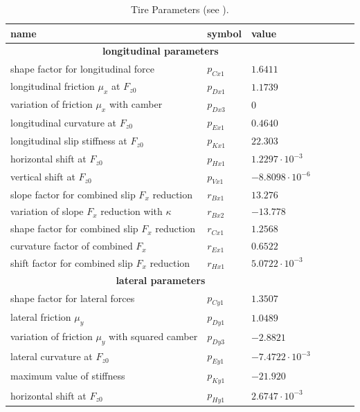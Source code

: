 \documentclass[11pt,a4paper]{article}
\renewcommand{\^}[1]{^{(#1)}}
\begin{document}
\begin{table}[h!tb]
\caption{Tire Parameters (see \cite[Sec.~PAC2002]{Adams2011}).}
{\small
\begin{center}\label{tab:tireParameters}
\begin{tabular}{lllclll}
	\toprule
	\textbf{name} & \textbf{symbol} & \textbf{value} \\ \hline
	\multicolumn{3}{c}{\textbf{longitudinal parameters}} \\ \hline
	shape factor for longitudinal force & $p_{Cx1}$ & $1.6411$ \\
	longitudinal friction $\mu_x$ at $F_{z0}$ & $p_{Dx1}$ & $1.1739$ \\
	variation of friction $\mu_x$ with camber & $p_{Dx3}$ & $0$  \\
	longitudinal curvature at $F_{z0}$ & $p_{Ex1}$ & $0.4640$ \\
	longitudinal slip stiffness at $F_{z0}$ & $p_{Kx1}$ & $22.303$ \\
	horizontal shift at $F_{z0}$ & $p_{Hx1}$ &  $1.2297\cdot 10^{-3}$ \\
	vertical shift at $F_{z0}$ & $p_{Vx1}$ & $-8.8098\cdot 10^{-6}$ \\
	slope factor for combined slip $F_x$ reduction & $r_{Bx1}$ & $13.276$ \\
	variation of slope $F_x$ reduction with $\kappa$ & $r_{Bx2}$ & $-13.778$ \\
	shape factor for combined slip $F_x$ reduction & $r_{Cx1}$ &  $1.2568$ \\
	curvature factor of combined $F_x$ & $r_{Ex1}$ & $0.6522$ \\
	shift factor for combined slip $F_x$ reduction & $r_{Hx1}$ & $5.0722\cdot 10^{-3}$ \\ \hline
	\multicolumn{3}{c}{\textbf{lateral parameters}} \\ \hline
	shape factor for lateral forces & $p_{Cy1}$ & $1.3507$ \\
	lateral friction $\mu_y$ & $p_{Dy1}$ & $1.0489$ \\
	variation of friction $\mu_y$ with squared camber & $p_{Dy3}$ & $-2.8821$ \\
	lateral curvature at $F_{z0}$ & $p_{Ey1}$ & $-7.4722\cdot 10^{-3}$ \\
	maximum value of stiffness  & $p_{Ky1}$ & $-21.920$ \\
	horizontal shift at $F_{z0}$ & $p_{Hy1}$ & $2.6747\cdot 10^{-3}$ \\

\end{tabular}
\end{center}}
\end{table}
\end{document}
